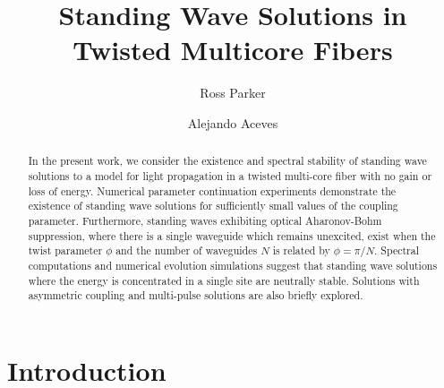 \documentclass[reprint, amsmath,amssymb,aps,pra]{revtex4-2}
\begin{document}
\title{Standing Wave Solutions in Twisted Multicore Fibers}

\author{Ross Parker}
\address{Department of Mathematics, Southern Methodist Univeristy, 
Dallas, TX 75275}

\author{Alejando Aceves}
\address{Department of Mathematics, Southern Methodist Univeristy, 
Dallas, TX 75275}

\begin{abstract}
In the present work, we consider the existence and spectral stability of standing wave solutions to a model for light propagation in a twisted multi-core fiber with no gain or loss of energy. Numerical parameter continuation experiments demonstrate the existence of standing wave solutions for sufficiently small values of the coupling parameter. Furthermore, standing waves exhibiting optical Aharonov-Bohm suppression, where there is a single waveguide which remains unexcited, exist when the twist parameter $\phi$ and the number of waveguides $N$ is related by $\phi = \pi/N$. Spectral computations and numerical evolution simulations suggest that standing wave solutions where the energy is concentrated in a single site are neutrally stable. Solutions with asymmetric coupling and multi-pulse solutions are also briefly explored. 
\end{abstract}

\maketitle

\section{Introduction}
\end{document}

